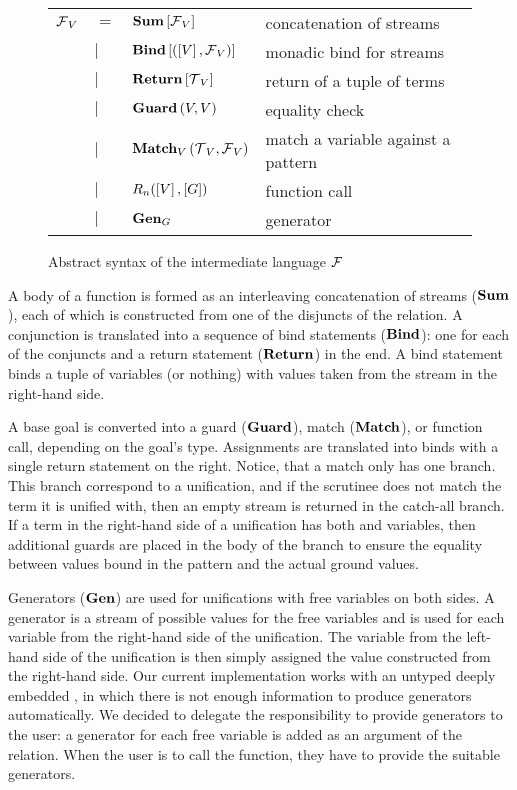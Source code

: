 \begin{figure}[h]
\begin{tabular}{llll}
    $\operatorname{\mathcal{F}}_{V}$ & $=$ & $\operatorname{\mathbf{Sum}}\left[ \operatorname{\mathcal{F}}_{V} \right]$ & concatenation of streams\\
               & $\mid$ & $\operatorname{\mathbf{Bind}}\left[ \left(\left[ V \right], \operatorname{\mathcal{F}}_{V}\right) \right] $ & monadic bind for streams\\
               & $\mid$ & $\operatorname{\mathbf{Return}} \left[ \operatorname{\mathcal{T}}_{V} \right]$ & return of a tuple of terms\\
               & $\mid$ & $\operatorname{\mathbf{Guard}}\left( V, V \right)$ & equality check\\
               & $\mid$ & $\operatorname{\mathbf{Match}}_{V} \left( \operatorname{\mathcal{T}}_{V}, \operatorname{\mathcal{F}}_{V} \right)$ & match a variable against a pattern\\
               & $\mid$ & $R_{n}(\left[ V \right], \left[ G \right])$ & function call\\
               & $\mid$ & $\operatorname{\mathbf{Gen}}_{G}$ & generator
\end{tabular}
\caption{Abstract syntax of the intermediate language $\operatorname{\mathcal{F}}$}
\label{fig:intermediate}
\end{figure}


A body of a function is formed as an interleaving concatenation of streams ($\operatorname{\mathbf{Sum}}$), each of which is constructed from one of the disjuncts of the relation.
A conjunction is translated into a sequence of bind statements ($\operatorname{\mathbf{Bind}}$): one for each of the conjuncts and a return statement ($\operatorname{\mathbf{Return}}$) in the end.
A bind statement binds a tuple of variables (or nothing) with values taken from the stream in the right-hand side.

A base goal is converted into a guard ($\operatorname{\mathbf{Guard}}$), match ($\operatorname{\mathbf{Match}}$), or function call, depending on the goal's type.
Assignments are translated into binds with a single return statement on the right.
Notice, that a match only has one branch.
This branch correspond to a unification, and if the scrutinee does not match the term it is unified with, then an empty stream is returned in the catch-all branch.
If a term in the right-hand side of a unification has both \outm and \inm variables, then additional guards are placed in the body of the branch to ensure the equality between values bound in the pattern and the actual ground values.

Generators ($\operatorname{\mathbf{Gen}}$) are used for unifications with free variables on both sides.
A generator is a stream of possible values for the free variables and is used for each variable from the right-hand side of the unification.
The variable from the left-hand side of the unification is then simply assigned the value constructed from the right-hand side.
Our current implementation works with an untyped deeply embedded \mk, in which there is not enough information to produce generators automatically.
We decided to delegate the responsibility to provide generators to the user: a generator for each free variable is added as an argument of the relation.
When the user is to call the function, they have to provide the suitable generators.

